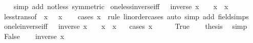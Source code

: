 \begin{isabellebody}
%
\isadelimproof
\ \ %
\endisadelimproof
%
\isatagproof
{}\isamarkupfalse%
\ {\isacharparenleft}{\kern0pt}simp\ add{\isacharcolon}{\kern0pt}\ not{\isacharunderscore}{\kern0pt}less\ {\isacharbrackleft}{\kern0pt}symmetric{\isacharbrackright}{\kern0pt}{\isacharparenright}{\kern0pt}%
\endisatagproof
{\isafoldproof}%
%
\isadelimproof
\isanewline
%
\endisadelimproof
\isanewline
{}\isamarkupfalse%
\ one{\isacharunderscore}{\kern0pt}less{\isacharunderscore}{\kern0pt}inverse{\isacharunderscore}{\kern0pt}iff{\isacharcolon}{\kern0pt}\ {\isachardoublequoteopen}{}\ {\isacharless}{\kern0pt}\ inverse\ x\ {\isasymlongleftrightarrow}\ {}\ {\isacharless}{\kern0pt}\ x\ {\isasymand}\ x\ {\isacharless}{\kern0pt}\ {}{\isachardoublequoteclose}\isanewline
%
\isadelimproof
\ \ %
\endisadelimproof
%
\isatagproof
{}\isamarkupfalse%
\ less{\isacharunderscore}{\kern0pt}trans{\isacharbrackleft}{\kern0pt}of\ {}\ x\ {}\ \ x{\isacharbrackright}{\kern0pt}\isanewline
\ \ \isamarkupfalse%
\ {\isacharparenleft}{\kern0pt}cases\ x\ {}\ rule{\isacharcolon}{\kern0pt}\ linorder{\isacharunderscore}{\kern0pt}cases{\isacharparenright}{\kern0pt}\ {\isacharparenleft}{\kern0pt}auto\ simp\ add{\isacharcolon}{\kern0pt}\ field{\isacharunderscore}{\kern0pt}simps{\isacharparenright}{\kern0pt}%
\endisatagproof
{\isafoldproof}%
%
\isadelimproof
\isanewline
%
\endisadelimproof
\isanewline
{}\isamarkupfalse%
\ one{\isacharunderscore}{\kern0pt}le{\isacharunderscore}{\kern0pt}inverse{\isacharunderscore}{\kern0pt}iff{\isacharcolon}{\kern0pt}\ {\isachardoublequoteopen}{}\ {\isasymle}\ inverse\ x\ {\isasymlongleftrightarrow}\ {}\ {\isacharless}{\kern0pt}\ x\ {\isasymand}\ x\ {\isasymle}\ {}{\isachardoublequoteclose}\isanewline
%
\isadelimproof
%
\endisadelimproof
%
\isatagproof
{}\isamarkupfalse%
\ {\isacharparenleft}{\kern0pt}cases\ {\isachardoublequoteopen}x\ {\isacharequal}{\kern0pt}\ {}{\isachardoublequoteclose}{\isacharparenright}{\kern0pt}\isanewline
\ \ \isamarkupfalse%
\ True\ \isamarkupfalse%
\ \isamarkupfalse%
\ {\isacharquery}{\kern0pt}thesis\ \isamarkupfalse%
\ simp\isanewline
{}\isamarkupfalse%
\isanewline
\ \ \isamarkupfalse%
\ False\ \isamarkupfalse%
\ \isamarkupfalse%
\ {\isachardoublequoteopen}inverse\ x\ {\isasymnoteq}\ {}{\isachardoublequoteclose}\ \isamarkupfalse%

\end{isabellebody}
